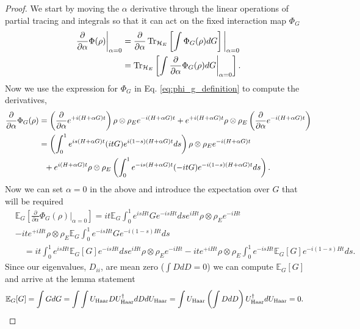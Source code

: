 \begin{proof}
    We start by moving the $\alpha$ derivative through the linear operations of partial tracing and integrals so that it can act on the fixed interaction map $\Phi_G$
    \begin{align}
        \frac{\partial}{\partial \alpha} \Phi(\rho) \bigg|_{\alpha = 0} &= \frac{\partial}{\partial \alpha} \Tr_{\mathcal{H}_E} \left[  \int \Phi_G(\rho) dG  \right] \bigg|_{\alpha = 0} \\
         &= \Tr_{\mathcal{H}_E} \left[  \int \frac{\partial}{\partial \alpha} \Phi_G(\rho) dG \bigg|_{\alpha = 0}   \right] .
    \end{align}
    Now we use the expression for $\Phi_G$ in Eq. \eqref{eq:phi_g_definition} to compute the derivatives,
    \begin{align}
        \frac{\partial}{\partial \alpha} \Phi_G (\rho) &= \left( \frac{\partial}{\partial \alpha} e^{+ i (H + \alpha G)t} \right) \rho \otimes \rho_E e^{-i (H + \alpha G) t} + e^{+i (H + \alpha G)t} \rho \otimes \rho_E \left( \frac{\partial}{\partial \alpha} e^{- i (H + \alpha G)t} \right) \\
        &= \left( \int_{0}^{1} e^{i s (H+\alpha G)t} (i t G) e^{i (1-s) (H+\alpha G)t} ds \right) \rho \otimes \rho_E e^{-i(H+\alpha G)t} \nonumber \\
    &~ ~+ e^{i(H+\alpha G)t} \rho \otimes \rho_E \left( \int_{0}^1 e^{-i s (H+\alpha G) t} (- i t G) e^{-i (1-s) (H+\alpha G)t} ds \right). \label{eq:first_order_alpha_derivative}
    \end{align}
    Now we can set $\alpha = 0$ in the above and introduce the expectation over $G$ that will be required
    \begin{align}
        &\mathbb{E}_G\left[ \frac{\partial}{\partial \alpha} \Phi_G(\rho) \bigg|_{\alpha = 0}\right] = i t \mathbb{E}_G \int_0^1 e^{i s H t} G e^{-i s H t} ds e^{i H t} \rho \otimes \rho_E e^{-i H t} \nonumber\\
&- i t e^{+i H t} \rho \otimes \rho_E \mathbb{E}_G \int_0^1 e^{-is H t} G e^{-i(1-s) Ht} ds \\ 
        &\quad= i t \int_0^1 e^{i s H t} \mathbb{E}_G[G] e^{-i s H t} ds e^{i H t} \rho \otimes \rho_E e^{-i H t} - i t e^{+i H t} \rho \otimes \rho_E \int_0^1 e^{-is H t} \mathbb{E}_G[G] e^{-i(1-s) Ht} ds.
    \end{align}
    Since our eigenvalues, $D_{ii}$, are mean zero ($\int D dD = 0$) we can compute $\mathbb{E}_G [G] $ and arrive at the lemma statement
    \begin{align}
        \mathbb{E}_G [G] &= \int G dG = \int \int U_{\text{Haar}} D U_{\text{Haar}}^\dagger dD dU_{\text{Haar}} = \int U_{\text{Haar}} \left( \int D dD \right) U_{\text{Haar}}^\dagger dU_{\text{Haar}} = 0.
    \end{align}
\end{proof}

